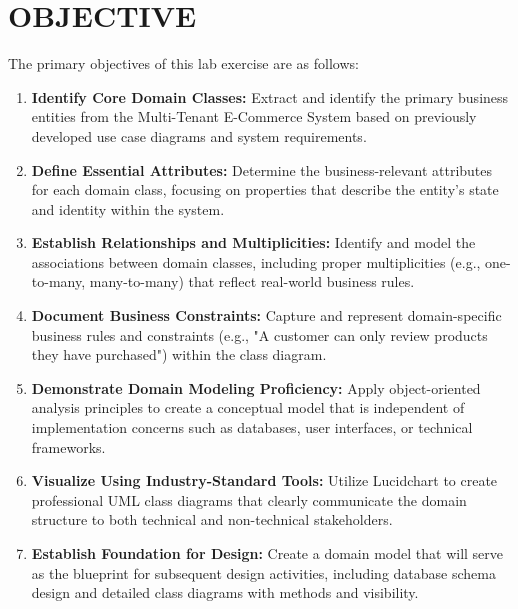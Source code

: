 \chapter{OBJECTIVE}\label{obj}

The primary objectives of this lab exercise are as follows:

\begin{enumerate}
    \item\textbf{Identify Core Domain Classes:} Extract and identify the primary business entities from the Multi-Tenant E-Commerce System based on previously developed use case diagrams and system requirements.
    
    \item\textbf{Define Essential Attributes:} Determine the business-relevant attributes for each domain class, focusing on properties that describe the entity's state and identity within the system.
    
    \item\textbf{Establish Relationships and Multiplicities:} Identify and model the associations between domain classes, including proper multiplicities (e.g., one-to-many, many-to-many) that reflect real-world business rules.
    
    \item\textbf{Document Business Constraints:} Capture and represent domain-specific business rules and constraints (e.g., "A customer can only review products they have purchased") within the class diagram.
    
    \item\textbf{Demonstrate Domain Modeling Proficiency:} Apply object-oriented analysis principles to create a conceptual model that is independent of implementation concerns such as databases, user interfaces, or technical frameworks.
    
    \item\textbf{Visualize Using Industry-Standard Tools:} Utilize Lucidchart to create professional UML class diagrams that clearly communicate the domain structure to both technical and non-technical stakeholders.
    
    \item\textbf{Establish Foundation for Design:} Create a domain model that will serve as the blueprint for subsequent design activities, including database schema design and detailed class diagrams with methods and visibility.
\end{enumerate}
\clearpage
















